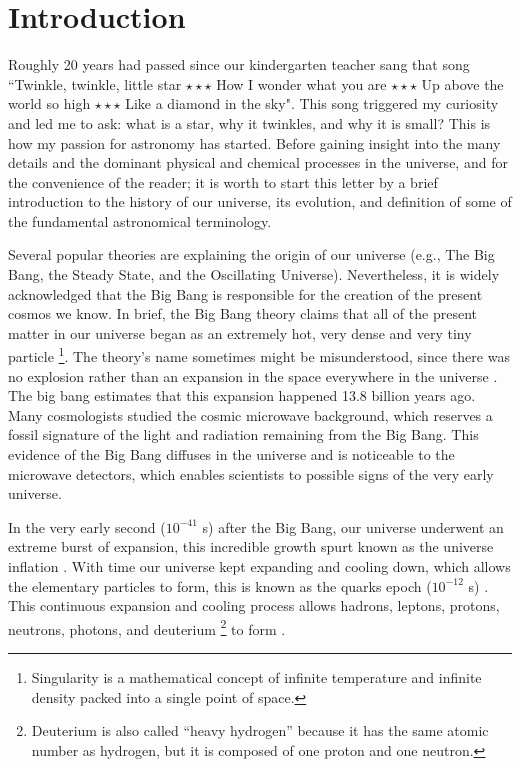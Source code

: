 \chapter{Introduction}\label{chap:introduction}




Roughly 20 years had passed since our kindergarten teacher sang that song ``Twinkle, twinkle, little star $\star \star \star $ How I wonder what you are $\star \star \star$ Up above the world so high $\star \star \star$ Like a diamond in the sky". This song triggered my curiosity and led me to ask: what is a star, why it twinkles, and why it is small? This is how my passion for astronomy has started. Before gaining insight into the many details and the dominant physical and chemical processes in the universe, and for the convenience of the reader; it is worth to start this letter by a brief introduction to the history of our universe, its evolution, and definition of some of the fundamental astronomical terminology.

Several popular theories are explaining the origin of our universe (e.g., The Big Bang, the Steady State, and the Oscillating Universe). Nevertheless, it is widely acknowledged that the Big Bang is responsible for the creation of the present cosmos we know. In brief, the Big Bang theory claims that all of the present matter in our universe began as an extremely hot, very dense and very tiny particle \citep[the so-called Singularity][]{1977cea..book.....M} \footnote{Singularity is a mathematical concept of infinite temperature and infinite density packed into a single point of space.}. The theory's name sometimes might be misunderstood, since there was no explosion rather than an expansion in the space everywhere in the universe \citep{1970Natur.228...21M,1980Sci...210...59S}. The big bang estimates that this expansion happened 13.8 billion years ago. Many cosmologists studied the cosmic microwave background, which reserves a fossil signature of the light and radiation remaining from the Big Bang. This evidence of the Big Bang diffuses in the universe and is noticeable to the microwave detectors, which enables scientists to possible signs of the very early universe. 

In the very early second ($10^{-41}$ s) after the Big Bang, our universe underwent an extreme burst of expansion, this incredible growth spurt known as the universe inflation \citep{1983Natur.304...39P,1987PhRvD..35.2955F, 1990bmc..book.....D}. With time our universe kept expanding and cooling down, which allows the elementary particles to form, this is known as the quarks epoch ($10^{-12}$ s) \citep{1962Natur.194..563H,1967PhRvL..18.1011H,1969PhRv..183.1057P,1973ApJ...180..317C,1978MNRAS.184..439E,1984NCimL..39..401L,1990Natur.348..705E}. This continuous expansion and cooling process allows hadrons, leptons, protons, neutrons, photons, and deuterium \footnote{Deuterium is also called “heavy hydrogen” because it has the same atomic number as hydrogen, but it is composed of one proton and one neutron.} to form \citep[1s to three minutes after the Big Bang,][]{1973PhDT........98K, 1979PZETF..30..726I, 1979Natur.279..303T}. 


